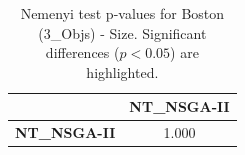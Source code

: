 \begin{table}[h!]
\centering
\scriptsize
\begin{tabular}{lc}
\toprule
 & NT\_NSGA-II \\
\midrule
\textbf{NT\_NSGA-II} & 1.000 \\
\bottomrule
\end{tabular}
\caption{Nemenyi test p-values for Boston (3_Objs) - Size. Significant differences ($p < 0.05$) are highlighted.}
\label{tab:nemenyi_nemenyi_Boston_3_Objs_Test_Size}
\end{table}